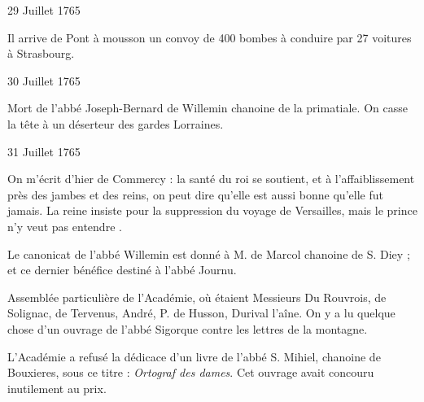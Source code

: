                      \begin{diary}{29 Juillet 1765}{}

                         Il arrive de Pont à mousson un convoy de 400
                           bombes à conduire par 27 voitures à Strasbourg. \bigskip


                     \end{diary}

                     \begin{diary}{30 Juillet 1765}{}

                         Mort de l'abbé Joseph-Bernard de
                              Willemin chanoine de la
                              primatiale.
                           On casse la tête à un
                           déserteur des gardes Lorraines. \bigskip


                     \end{diary}


                     \begin{diary}{31 Juillet 1765}{}

                         On m'écrit d'hier de Commercy : \og la santé
                              du roi se soutient, et
                              à l'affaiblissement près des jambes et des reins, on peut dire qu'elle est
                              aussi bonne qu'elle fut jamais. La reine insiste
                              pour la suppression du voyage de Versailles,
                              mais le prince n'y veut pas entendre \fg{}. \bigskip


                         Le canonicat de l'abbé Willemin est donné
                           à M. de Marcol chanoine de
                              S. Diey ; et ce
                           dernier bénéfice destiné à l'abbé
                              Journu. \bigskip


                         Assemblée particulière de l'Académie, où étaient
                           Messieurs
                           Du Rouvrois, de Solignac, de
                              Tervenus,
                           André, P.
                              de Husson, Durival
                              l'aîne. On
                           y a lu quelque chose d'un ouvrage de
                                 l'abbé
                                 Sigorque contre les lettres de la montagne. \bigskip



                           L'Académie a refusé la dédicace
                           d'un
                           livre de l'abbé S.
                              Mihiel, chanoine de Bouxieres,
                           sous ce titre : \emph{Ortograf des dames}.
                           Cet ouvrage avait concouru inutilement
                           au prix. \bigskip


                     \end{diary}

